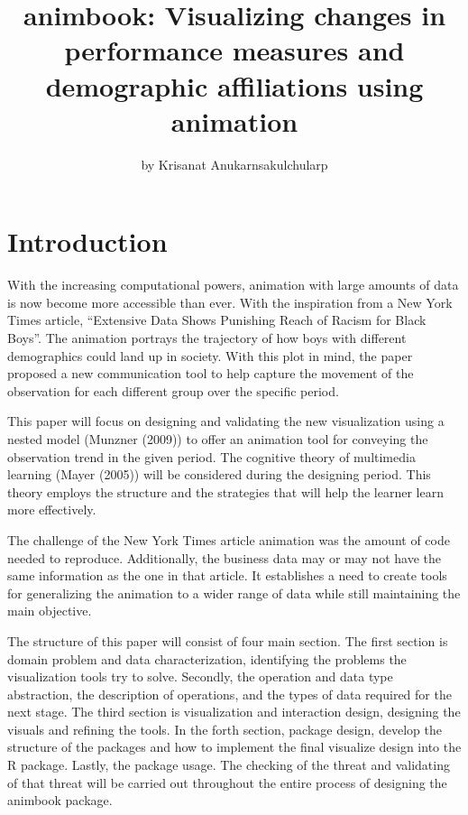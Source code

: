 \title{animbook: Visualizing changes in performance measures and demographic affiliations using animation}


\author{by Krisanat Anukarnsakulchularp}

\maketitle


\hypertarget{introduction}{%
\section{Introduction}\label{introduction}}

With the increasing computational powers, animation with large amounts of data is now become more accessible than ever. With the inspiration from a New York Times article, ``Extensive Data Shows Punishing Reach of Racism for Black Boys''. The animation portrays the trajectory of how boys with different demographics could land up in society. With this plot in mind, the paper proposed a new communication tool to help capture the movement of the observation for each different group over the specific period.

This paper will focus on designing and validating the new visualization using a nested model (Munzner (2009)) to offer an animation tool for conveying the observation trend in the given period. The cognitive theory of multimedia learning (Mayer (2005)) will be considered during the designing period. This theory employs the structure and the strategies that will help the learner learn more effectively.

The challenge of the New York Times article animation was the amount of code needed to reproduce. Additionally, the business data may or may not have the same information as the one in that article. It establishes a need to create tools for generalizing the animation to a wider range of data while still maintaining the main objective.

The structure of this paper will consist of four main section. The first section is domain problem and data characterization, identifying the problems the visualization tools try to solve. Secondly, the operation and data type abstraction, the description of operations, and the types of data required for the next stage. The third section is visualization and interaction design, designing the visuals and refining the tools. In the forth section, package design, develop the structure of the packages and how to implement the final visualize design into the R package. Lastly, the package usage. The checking of the threat and validating of that threat will be carried out throughout the entire process of designing the animbook package.

